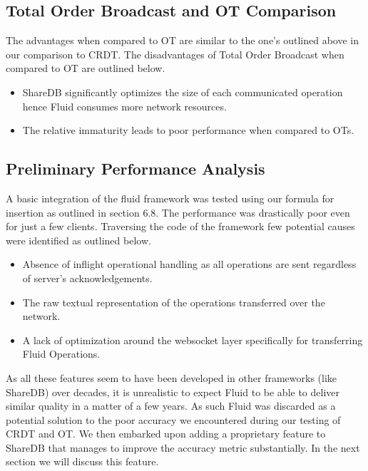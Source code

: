 \documentclass[9pt, titlepage]{article}
\begin{document}
  \subsection{Total Order Broadcast and OT Comparison}
  The advantages when compared to OT are similar to the one's outlined above in our comparison to CRDT.
  The disadvantages of Total Order Broadcast when compared to OT are outlined below.

  \begin{itemize}
    \item ShareDB significantly optimizes the size of each communicated operation hence Fluid consumes more network resources.
    \item The relative immaturity leads to poor performance when compared to OTs.
  \end{itemize}

  \subsection{Preliminary Performance Analysis}
  A basic integration of the fluid framework was tested using our formula for insertion as outlined in section 6.8. The performance
  was drastically poor even for just a few clients. Traversing the code of the framework few potential causes were identified as outlined 
  below.
  
  \begin{itemize}
    \item Absence of inflight operational handling as all operations are sent regardless of server's acknowledgements.
    \item The raw textual representation of the operations transferred over the network.
    \item A lack of optimization around the websocket layer specifically for transferring Fluid Operations.
  \end{itemize}

  As all these features seem to have been developed in other frameworks (like ShareDB) over decades, it is unrealistic to expect
  Fluid to be able to deliver similar quality in a matter of a few years. As such Fluid was discarded as a potential solution to
  the poor accuracy we encountered during our testing of CRDT and OT. We then embarked upon adding a proprietary feature to ShareDB 
  that manages to improve the accuracy metric substantially. In the next section we will discuss this feature.
  
  \break
\end{document}
